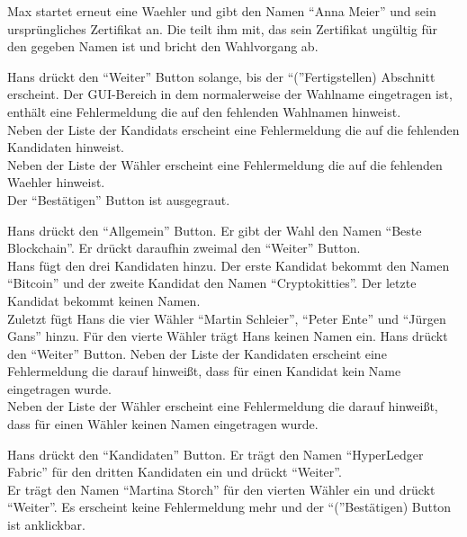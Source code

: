 \documentclass[parskip=full,11pt,twoside]{scrartcl}
\begin{document}
\teststep{}
		{Max startet erneut eine \gls{Waehler}  und gibt den Namen \enquote{Anna Meier} und sein ursprüngliches \gls{Zertifikat} an.}
		{Die  teilt ihm mit, das sein \gls{Zertifikat} ungültig für den gegeben Namen ist und bricht den Wahlvorgang ab.}


		{Hans drückt den \enquote{Weiter} Button solange, bis der \enquote(Fertigstellen) Abschnitt erscheint.}
		{Der GUI-Bereich in dem normalerweise der Wahlname eingetragen ist, enthält eine Fehlermeldung die auf den fehlenden Wahlnamen hinweist.\\
		Neben der Liste der \glspl{Kandidat} erscheint eine Fehlermeldung die auf die fehlenden Kandidaten hinweist.\\
		Neben der Liste der Wähler erscheint eine Fehlermeldung die auf die fehlenden \gls{Waehler} hinweist.\\
		Der \enquote{Bestätigen} Button ist ausgegraut.}

\teststep{}
		{Hans drückt den \enquote{Allgemein} Button. Er gibt der Wahl den Namen \enquote{Beste Blockchain}. Er drückt daraufhin zweimal den \enquote{Weiter} Button.\\
		Hans fügt den drei Kandidaten hinzu. Der erste Kandidat bekommt den Namen \enquote{Bitcoin} und der zweite Kandidat den Namen \enquote{Cryptokitties}. Der letzte Kandidat bekommt keinen Namen.\\
		Zuletzt fügt Hans die vier Wähler \enquote{Martin Schleier}, \enquote{Peter Ente} und \enquote{Jürgen Gans} hinzu. Für den vierte Wähler trägt Hans keinen Namen ein. Hans drückt den \enquote{Weiter} Button.}
		{Neben der Liste der Kandidaten erscheint eine Fehlermeldung die darauf hinweißt, dass für einen Kandidat kein Name eingetragen wurde.\\
		Neben der Liste der Wähler erscheint eine Fehlermeldung die darauf hinweißt, dass für einen Wähler keinen Namen eingetragen wurde.}
	
\teststep{}
		{Hans drückt den \enquote{Kandidaten} Button. Er trägt den Namen \enquote{HyperLedger Fabric} für den dritten Kandidaten ein und drückt \enquote{Weiter}.\\
		Er trägt den Namen \enquote{Martina Storch} für den vierten Wähler ein und drückt \enquote{Weiter}.}
		{Es erscheint keine Fehlermeldung mehr und der \enquote(Bestätigen) Button ist anklickbar.}
\end{document}
